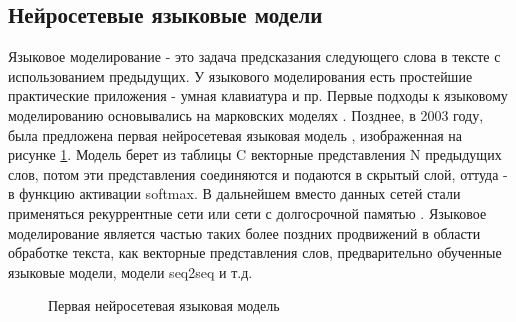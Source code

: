 \subsection{Нейросетевые языковые модели}

Языковое моделирование - это задача предсказания следующего слова в тексте с использованием предыдущих. У языкового моделирования есть простейшие практические приложения - умная клавиатура и пр. Первые подходы к языковому моделированию основывались на марковских моделях\cite{kneser_1995} . Позднее, в 2003 году, была предложена первая нейросетевая языковая модель \cite{bengio_2003}, изображенная на рисунке \ref{fig:Neuro1-Feedforward}. 
Модель берет из таблицы C векторные представления N предыдущих слов, потом эти представления соединяются и подаются в скрытый слой, оттуда - в функцию активации softmax. В дальнейшем вместо данных сетей стали применяться рекуррентные сети \cite{mikolov_2010} или сети с долгосрочной памятью \cite{hochreiter_1997}.%
Языковое моделирование является частью таких более поздних продвижений в области обработке текста, как векторные представления слов, предварительно обученные языковые модели, модели seq2seq и т.д.

\begin{figure}[ht]
 \caption{Первая нейросетевая языковая модель}\label{fig:Neuro1-Feedforward}
\end{figure}


